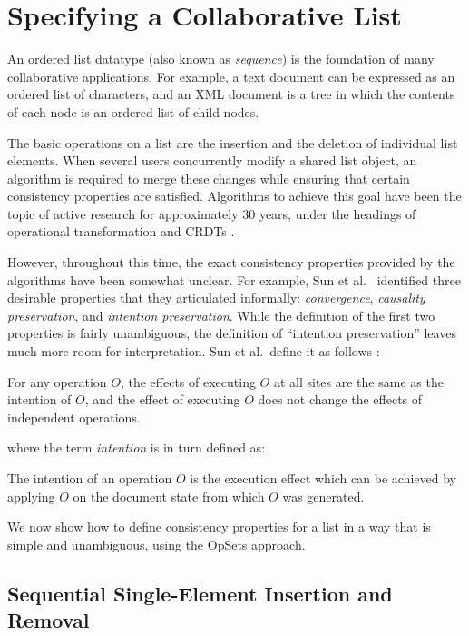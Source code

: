 \section{Specifying a Collaborative List}\label{sec:list}

An ordered list datatype (also known as \emph{sequence}) is the foundation of many collaborative applications.
For example, a text document can be expressed as an ordered list of characters, and an XML document is a tree in which the contents of each node is an ordered list of child nodes.

The basic operations on a list are the insertion and the deletion of individual list elements.
When several users concurrently modify a shared list object, an algorithm is required to merge these changes while ensuring that certain consistency properties are satisfied.
Algorithms to achieve this goal have been the topic of active research for approximately 30 years, under the headings of operational transformation \cite{Ellis:1989ue,Li:2004er,Nichols:1995fd,Oster:2006tr,Ressel:1996wx,Suleiman:1998eu,Sun:1998vf,Sun:1998un} and CRDTs \cite{Nedelec:2013ky,Nedelec:2016eo,Oster:2006wj,Preguica:2009fz,Roh:2011dw,Weiss:2010hx}.

However, throughout this time, the exact consistency properties provided by the algorithms have been somewhat unclear.
For example, Sun et al.~\cite{Sun:1998un} identified three desirable properties that they articulated informally: \emph{convergence}, \emph{causality preservation}, and \emph{intention preservation}.
While the definition of the first two properties is fairly unambiguous, the definition of ``intention preservation'' leaves much more room for interpretation.
Sun et al.\ define it as follows \cite{Sun:1998un}:
\begin{displayquote}
For any operation $O$, the effects of executing $O$ at all sites are the same as the intention of $O$, and the effect of executing $O$ does not change the effects of independent operations.
\end{displayquote}
where the term \emph{intention} is in turn defined as:
\begin{displayquote}
The intention of an operation $O$ is the execution effect which can be achieved by applying $O$ on the document state from which $O$ was generated.
\end{displayquote}
We now show how to define consistency properties for a list in a way that is simple and unambiguous, using the OpSets approach.

\subsection{Sequential Single-Element Insertion and Removal}

